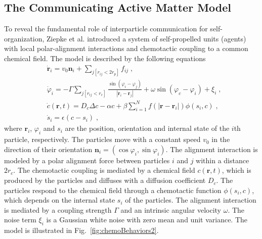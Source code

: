 \documentclass[a4paper, amsfonts, amssymb, amsmath, reprint, showkeys, showpacs, nofootinbib, twoside]{revtex4-2}
\begin{document}
\subsection{The Communicating Active Matter Model}
To reveal the fundamental role of interparticle communication for self-organization, Ziepke et al. \cite{Ziepke2022} introduced a system of self-propelled units (agents) with local polar-alignment interactions and chemotactic coupling to a common chemical field. The model is described by the following equations
\begin{subequations}
    \label{eq:communicatingActiveMatter}
    \begin{align}
        &\dot{\mathbf{r}}_i=v_0\mathbf{n}_i+\sum_{j\left[ r_{ij}<2r_p \right]}{f_{ij}}\;,\\
        &\dot{\varphi}_i=-\varGamma \sum_{j\left[ r_{ij}<r_c \right]}{\frac{\sin \left( \varphi _i-\varphi _j \right)}{\left| \mathbf{r}_i-\mathbf{r}_j \right|}}+\omega \sin \left( \varphi _c-\varphi _i \right) +\xi _i\;,\\
        &\dot{c}\left( \mathbf{r},t \right) =D_c\Delta c-\alpha c+\beta \sum_{i=1}^N{f\left( \left| \mathbf{r}-\mathbf{r}_i \right| \right) \phi \left( s_i,c \right)}\;,\\
        &\dot{s}_i=\epsilon \left( c-s_i \right)\;,
    \end{align}
\end{subequations}
where $\mathbf{r}_i$, $\varphi _i$ and $s_i$ are the position, orientation and internal state of the $i$th particle, respectively. The particles move with a constant speed $v_0$ in the direction of their orientation $\mathbf{n}_i=\left( \cos \varphi _i,\sin \varphi _i \right)$. The alignment interaction is modeled by a polar alignment force between particles $i$ and $j$ within a distance $2r_c$. The chemotactic coupling is mediated by a chemical field $c(\mathbf{r},t)$, which is produced by the particles and diffuses with a diffusion coefficient $D_c$. The particles respond to the chemical field through a chemotactic function $\phi \left( s_i,c \right)$, which depends on the internal state $s_i$ of the particles. The alignment interaction is mediated by a coupling strength $\varGamma$ and an intrinsic angular velocity $\omega$. The noise term $\xi _i$ is a Gaussian white noise with zero mean and unit variance. The model is illustrated in Fig.~\ref{fig:chemoBehaviors2}.
\end{document}
